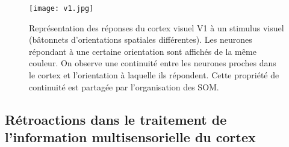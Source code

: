 \documentclass[../main]{subfiles}
\begin{document}
\begin{figure}
\centering
\texttt{[image: v1.jpg]}
\caption{Représentation des réponses du cortex visuel V1 à un stimulus visuel (bâtonnets d'orientations spatiales différentes). Les neurones répondant à une certaine orientation sont affichés de la même couleur. On observe une continuité entre les neurones proches dans le cortex et l'orientation à laquelle ils répondent. Cette propriété de continuité est partagée par l'organisation des SOM.\label{fig:v1}}
\end{figure}

\subsection{Rétroactions dans le traitement de l'information multisensorielle du cortex}
\end{document}
